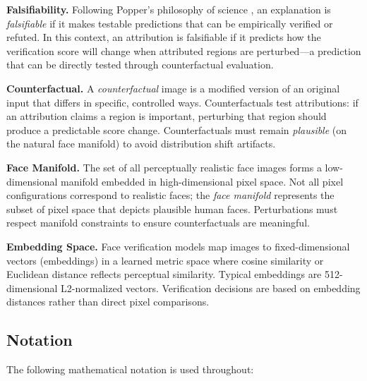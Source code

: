 \textbf{Falsifiability.} Following Popper's philosophy of science \cite{popper1959logic}, an explanation is \emph{falsifiable} if it makes testable predictions that can be empirically verified or refuted. In this context, an attribution is falsifiable if it predicts how the verification score will change when attributed regions are perturbed---a prediction that can be directly tested through counterfactual evaluation.

\textbf{Counterfactual.} A \emph{counterfactual} image is a modified version of an original input that differs in specific, controlled ways. Counterfactuals test attributions: if an attribution claims a region is important, perturbing that region should produce a predictable score change. Counterfactuals must remain \emph{plausible} (on the natural face manifold) to avoid distribution shift artifacts.

\textbf{Face Manifold.} The set of all perceptually realistic face images forms a low-dimensional manifold embedded in high-dimensional pixel space. Not all pixel configurations correspond to realistic faces; the \emph{face manifold} represents the subset of pixel space that depicts plausible human faces. Perturbations must respect manifold constraints to ensure counterfactuals are meaningful.

\textbf{Embedding Space.} Face verification models map images to fixed-dimensional vectors (embeddings) in a learned metric space where cosine similarity or Euclidean distance reflects perceptual similarity. Typical embeddings are 512-dimensional L2-normalized vectors. Verification decisions are based on embedding distances rather than direct pixel comparisons.

\subsection{Notation}

The following mathematical notation is used throughout:

